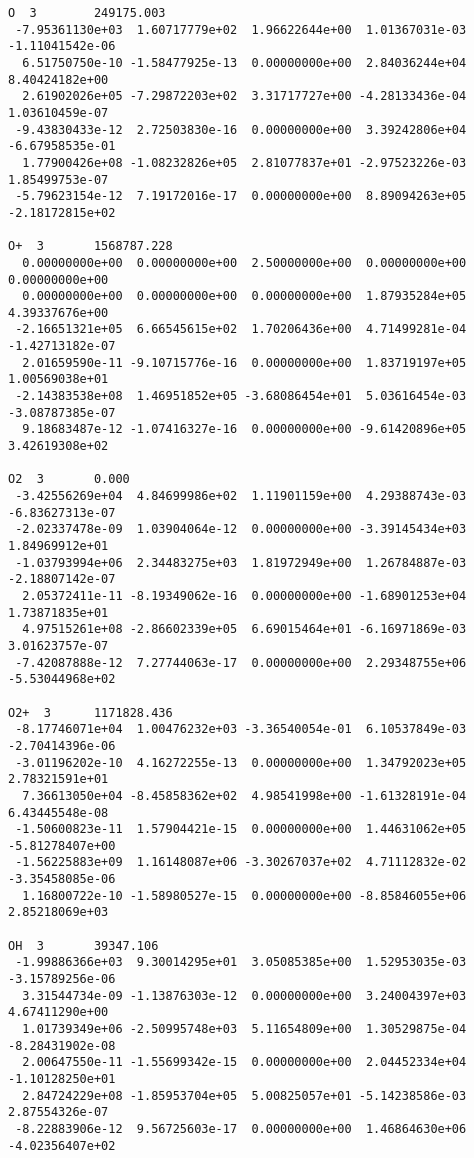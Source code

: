 \begin{verbatim}
O  3		249175.003							 
 -7.95361130e+03  1.60717779e+02  1.96622644e+00  1.01367031e-03 -1.11041542e-06
  6.51750750e-10 -1.58477925e-13  0.00000000e+00  2.84036244e+04  8.40424182e+00
  2.61902026e+05 -7.29872203e+02  3.31717727e+00 -4.28133436e-04  1.03610459e-07
 -9.43830433e-12  2.72503830e-16  0.00000000e+00  3.39242806e+04 -6.67958535e-01
  1.77900426e+08 -1.08232826e+05  2.81077837e+01 -2.97523226e-03  1.85499753e-07
 -5.79623154e-12  7.19172016e-17  0.00000000e+00  8.89094263e+05 -2.18172815e+02
										 
O+  3		1568787.228							 
  0.00000000e+00  0.00000000e+00  2.50000000e+00  0.00000000e+00  0.00000000e+00
  0.00000000e+00  0.00000000e+00  0.00000000e+00  1.87935284e+05  4.39337676e+00
 -2.16651321e+05  6.66545615e+02  1.70206436e+00  4.71499281e-04 -1.42713182e-07
  2.01659590e-11 -9.10715776e-16  0.00000000e+00  1.83719197e+05  1.00569038e+01
 -2.14383538e+08  1.46951852e+05 -3.68086454e+01  5.03616454e-03 -3.08787385e-07
  9.18683487e-12 -1.07416327e-16  0.00000000e+00 -9.61420896e+05  3.42619308e+02
										 
O2  3		0.000								 
 -3.42556269e+04  4.84699986e+02  1.11901159e+00  4.29388743e-03 -6.83627313e-07
 -2.02337478e-09  1.03904064e-12  0.00000000e+00 -3.39145434e+03  1.84969912e+01
 -1.03793994e+06  2.34483275e+03  1.81972949e+00  1.26784887e-03 -2.18807142e-07
  2.05372411e-11 -8.19349062e-16  0.00000000e+00 -1.68901253e+04  1.73871835e+01
  4.97515261e+08 -2.86602339e+05  6.69015464e+01 -6.16971869e-03  3.01623757e-07
 -7.42087888e-12  7.27744063e-17  0.00000000e+00  2.29348755e+06 -5.53044968e+02
										 
O2+  3		1171828.436						         
 -8.17746071e+04  1.00476232e+03 -3.36540054e-01  6.10537849e-03 -2.70414396e-06
 -3.01196202e-10  4.16272255e-13  0.00000000e+00  1.34792023e+05  2.78321591e+01
  7.36613050e+04 -8.45858362e+02  4.98541998e+00 -1.61328191e-04  6.43445548e-08
 -1.50600823e-11  1.57904421e-15  0.00000000e+00  1.44631062e+05 -5.81278407e+00
 -1.56225883e+09  1.16148087e+06 -3.30267037e+02  4.71112832e-02 -3.35458085e-06
  1.16800722e-10 -1.58980527e-15  0.00000000e+00 -8.85846055e+06  2.85218069e+03
										 
OH  3		39347.106							 
 -1.99886366e+03  9.30014295e+01  3.05085385e+00  1.52953035e-03 -3.15789256e-06
  3.31544734e-09 -1.13876303e-12  0.00000000e+00  3.24004397e+03  4.67411290e+00
  1.01739349e+06 -2.50995748e+03  5.11654809e+00  1.30529875e-04 -8.28431902e-08
  2.00647550e-11 -1.55699342e-15  0.00000000e+00  2.04452334e+04 -1.10128250e+01
  2.84724229e+08 -1.85953704e+05  5.00825057e+01 -5.14238586e-03  2.87554326e-07
 -8.22883906e-12  9.56725603e-17  0.00000000e+00  1.46864630e+06 -4.02356407e+02
										 

\end{verbatim}
